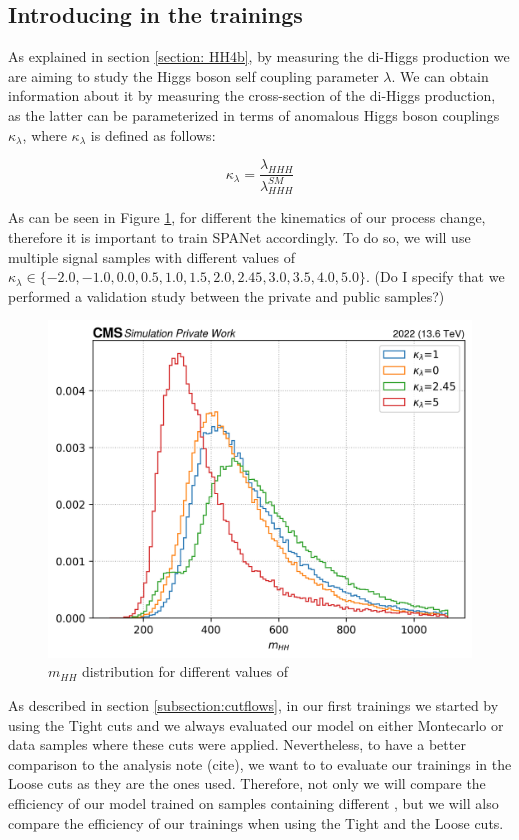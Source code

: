 \subsection{Introducing \kl in the trainings}

As explained in section \ref{section: HH4b}, by measuring the di-Higgs production we are aiming to study 
the Higgs boson self coupling parameter $\lambda$. We can obtain information about it by measuring the cross-section of the di-Higgs production, as the latter can be parameterized in terms of anomalous Higgs boson couplings $\kappa_\lambda$, where $\kappa_\lambda$ is defined as follows:

\begin{equation}
    \kappa_\lambda=\frac{\lambda_{HHH}}{\lambda^{SM}_{HHH}}
\end{equation}

As can be seen in Figure \ref{fig: mhh dist}, for different \kl the kinematics 
of our process change, therefore it is important to train SPANet accordingly. 
To do so, we will use multiple signal samples with different values of $\kappa_\lambda 
\in \{-2.0, -1.0, 0.0, 0.5, 1.0, 1.5, 2.0, 2.45, 3.0, 3.5, 4.0, 5.0\}$. (Do I specify that we performed a validation study between the private and public samples?)

\begin{figure}[hbt]
    \centering
    \includegraphics[width=0.5\linewidth]{Images/6.Improving/kappa lambda/mhh distribution for diff kl.png}
    \caption{$m_{HH}$ distribution for different values of \kl}
    \label{fig: mhh dist}
\end{figure}


\vspace{0.2cm}

As described in section \ref{subsection:cutflows}, in our first trainings we started by using the Tight cuts and we always evaluated our model on either Montecarlo or data samples where these cuts were applied. Nevertheless, to have a better comparison to the analysis note (cite), we want to to evaluate our trainings in the Loose cuts as they are the ones used. Therefore, not only we will compare the efficiency of our model trained on samples containing different \kl, but we will also compare the efficiency of our trainings when using the Tight and the Loose cuts.

